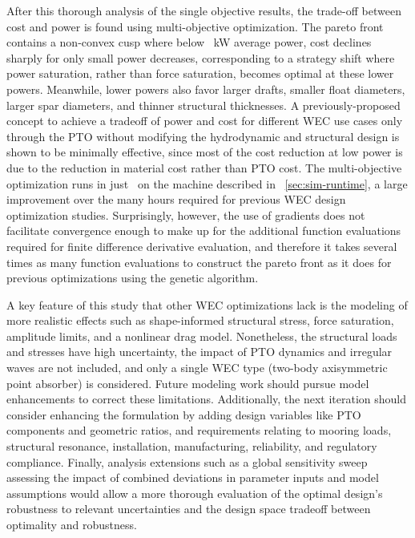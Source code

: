 \documentclass[preprint,12pt]{elsarticle}
\begin{document}
After this thorough analysis of the single objective results, the trade-off between cost and power is found using multi-objective optimization.
The pareto front contains a non-convex cusp where below \powerWhereCusp~kW average power, cost declines sharply for only small power decreases, corresponding to a strategy shift where power saturation, rather than force saturation, becomes optimal at these lower powers. 
Meanwhile, lower powers also favor larger drafts, smaller float diameters, larger spar diameters, and thinner structural thicknesses.
A previously-proposed concept to achieve a tradeoff of power and cost for different WEC use cases only through the PTO without modifying the hydrodynamic and structural design is shown to be minimally effective, since most of the cost reduction at low power is due to the reduction in material cost rather than PTO cost.
The multi-objective optimization runs in just \paretoRuntime~on the machine described in \sectionautorefname~\ref{sec:sim-runtime}, a large improvement over the many hours required for previous WEC design optimization studies.
Surprisingly, however, the use of gradients does not facilitate convergence enough to make up for the additional function evaluations required for finite difference derivative evaluation, and therefore it takes several times as many function evaluations to construct the pareto front as it does for previous optimizations using the genetic algorithm.

A key feature of this study that other WEC optimizations lack is the modeling of more realistic effects such as shape-informed structural stress, force saturation, amplitude limits, and a nonlinear drag model.
Nonetheless, the structural loads and stresses have high uncertainty, the impact of PTO dynamics and irregular waves are not included, and only a single WEC type (two-body axisymmetric point absorber) is considered.
Future modeling work should pursue model enhancements to correct these limitations.
Additionally, the next iteration should consider enhancing the formulation by adding design variables like PTO components and geometric ratios, and requirements relating to mooring loads, structural resonance, installation, manufacturing, reliability, and regulatory compliance. 
Finally, analysis extensions such as a global sensitivity sweep assessing the impact of combined deviations in parameter inputs and model assumptions would allow a more thorough evaluation of the optimal design's robustness to relevant uncertainties and the design space tradeoff between optimality and robustness.
\end{document}
